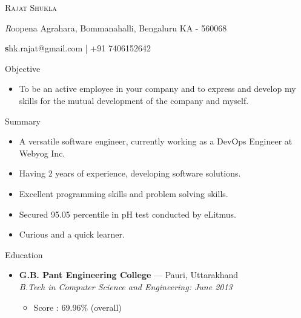 \documentclass[11pt,oneside]{article}
\makeatletter
\newcommand{\name}{Rajat Shukla}
\newcommand{\addr}{Roopena Agrahara, Bommanahalli, Bengaluru KA - 560068}
\newcommand{\contact}{shk.rajat@gmail.com | +91 7406152642}
\newcommand{\bigname}[1]{
  \begin{center}\fontfamily{phv}\selectfont\Huge\scshape#1\end{center}
}
\newcommand{\bignamenew}[1]{
  \begin{center}\selectfont\Huge\scshape#1\end{center}
}
\newcommand{\addrinfo}[1]{
  \begin{center}\selectfont\small\textit#1\end{center}
}
\newcommand{\contactinfo}[1]{
  \begin{center}\selectfont\small\textbf#1\end{center}
}
\newcommand{\resdescpara}[1]{
  \vspace{-5pt}
\item
  #1
}
\newenvironment{ressection}[1]{
  \vspace{4pt}
         {\fontfamily{phv}\selectfont\Large#1}
         \begin{itemize}
           \vspace{3pt}
}{
         \end{itemize}
}
\newcommand{\resitem}[1]{
  \vspace{-4pt}
\item \begin{flushleft} #1 \end{flushleft}
}
\newcommand{\ressubitem}[1]{
  \vspace{-1pt}
\item \begin{flushleft} #1 \end{flushleft}
}
\newcommand{\resbigitem}[3]{
  \vspace{-5pt}
\item
  \textbf{#1} --- #2 \\
  \textit{#3}
}
\newenvironment{ressubsec}[3]{
  \resbigitem{#1}{#2}{#3}
  \vspace{-2pt}
  \begin{itemize}
}{
  \end{itemize}
}
\makeatother
\begin{document}



\bigname{\name}

\vspace{2 pt}
\addrinfo{\addr}

\contactinfo{\contact}
\vspace{8 pt}


\begin{ressection}{Objective}
  \resdescpara{To be an active employee in your company and to express and develop my skills for the mutual development of the company and myself.}
\end{ressection}


\begin{ressection}{Summary}
  \resitem{A versatile software engineer, currently working as a DevOps Engineer at Webyog Inc.}
  \resitem{Having 2 years of experience, developing software solutions.}
  \resitem{Excellent programming skills and problem solving skills.}
  \resitem{Secured 95.05 percentile in pH test conducted by eLitmus.}
  \resitem{Curious and a quick learner.}
\end{ressection}



\begin{ressection}{Education}
  \begin{ressubsec}{G.B. Pant Engineering College}{Pauri, Uttarakhand}{B.Tech in Computer Science and Engineering: June 2013}
    \ressubitem{Score : 69.96\% (overall)}
  \end{ressubsec}
\end{ressection}

\end{document}
